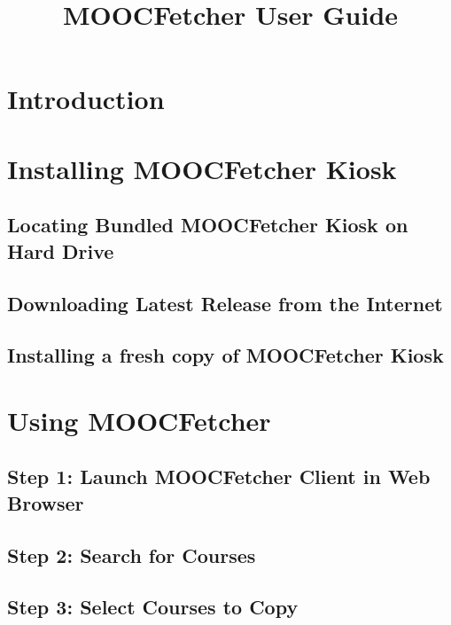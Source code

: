 \documentclass[]{article}
\title{MOOCFetcher User Guide}
\date{}
\begin{document}
\maketitle

\section{Introduction}\label{introduction}

\section{Installing MOOCFetcher
Kiosk}\label{installing-moocfetcher-kiosk}

\subsection{Locating Bundled MOOCFetcher Kiosk on Hard
Drive}\label{locating-bundled-moocfetcher-kiosk-on-hard-drive}

\subsection{Downloading Latest Release from the
Internet}\label{downloading-latest-release-from-the-internet}

\subsection{Installing a fresh copy of MOOCFetcher
Kiosk}\label{installing-a-fresh-copy-of-moocfetcher-kiosk}

\section{Using MOOCFetcher}\label{using-moocfetcher}

\subsection{Step 1: Launch MOOCFetcher Client in Web
Browser}\label{step-1-launch-moocfetcher-client-in-web-browser}

\subsection{Step 2: Search for Courses}\label{step-2-search-for-courses}

\subsection{Step 3: Select Courses to
Copy}\label{step-3-select-courses-to-copy}
\end{document}
